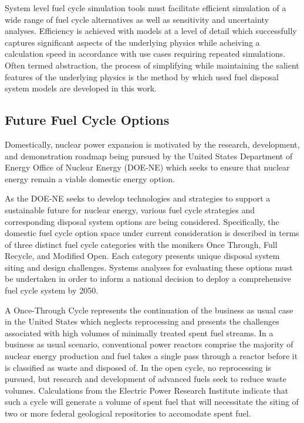 System level fuel cycle simulation tools must facilitate efficient 
simulation of a wide range of fuel cycle alternatives as well as 
sensitivity and uncertainty analyses. Efficiency is achieved with 
models at a level of detail which successfully captures significant 
aspects of the underlying physics while acheiving a calculation speed 
in accordance with use cases requiring repeated simulations. Often 
termed abstraction, the process of simplifying while maintaining the 
salient features of the underlying physics is the method by which used 
fuel disposal system models are developed in this work. 

\subsection{Future Fuel Cycle Options}

Domestically, nuclear power expansion is motivated by the research, 
development, and demonstration roadmap being pursued by the United 
States Department of Energy Office of Nuclear Energy (DOE-NE) which 
seeks to ensure that nuclear energy remain a viable domestic energy 
option.  \cite{department_of_energy_-_nuclear_energy_nuclear_2010} 

As the DOE-NE seeks to develop technologies and strategies to support 
a sustainable future for nuclear energy, various fuel cycle strategies 
and corresponding disposal system options are being considered.  
Specifically, the domestic fuel cycle option space under current 
consideration is described in terms of three distinct fuel cycle 
categories with the monikers Once Through, Full Recycle, and Modified 
Open. Each category presents unique disposal system siting and design 
challenges. Systems analyses for evaluating these options must be 
undertaken in order to inform a national decision to deploy a 
comprehensive fuel cycle system by 2050.  
\cite{department_of_energy_-_nuclear_energy_nuclear_2010} 

A Once-Through Cycle represents the continuation of the business as 
usual case in the United States which neglects reprocessing and 
presents the challenges associated with high volumes of minimally 
treated spent fuel streams.  In a business as usual scenario, 
conventional power reactors comprise the majority of nuclear energy 
production and fuel takes a single pass through a reactor before it is 
classified as waste and disposed of. In the open cycle, no 
reprocessing is pursued, but research and development of advanced 
fuels seek to reduce waste volumes. Calculations from the Electric 
Power Research Institute indicate that such a cycle will generate a 
volume of spent fuel that will necessitate the siting of two or more 
federal  geological repositories to accomodate spent fuel.  
\cite{kessler_room_2006}  %

